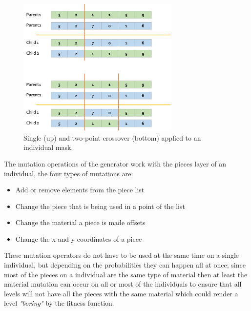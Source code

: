 \documentclass[conference]{IEEEtran}
\begin{document}
    \begin{figure}[htbp]
        \centerline{\includegraphics[width=80mm]{Images/crossover.png}}
        \caption{Single (up) and two-point crossover (bottom) applied to an individual mask.}
        \label{crossover}
    \end{figure}
    
    The mutation operations of the generator work with the pieces layer of an
    individual, the four types of mutations are:
    
    \begin{itemize}
        \item Add or remove elements from the piece list
        \item Change the piece that is being used in a point of the list
        \item Change the material a piece is made offsets
        \item Change the x and y coordinates of a piece
    \end{itemize}
    
    These mutation operators do not have to be used at the same time on a single
    individual, but depending on the probabilities they can happen all at once;
    since most of the pieces on a individual are the same type of
    material then at least the material mutation can occur on all or most of
    the individuals to ensure that all levels will not have all the pieces with
    the same material which could render a level \textit{"boring"} by the
    fitness function.
\end{document}
